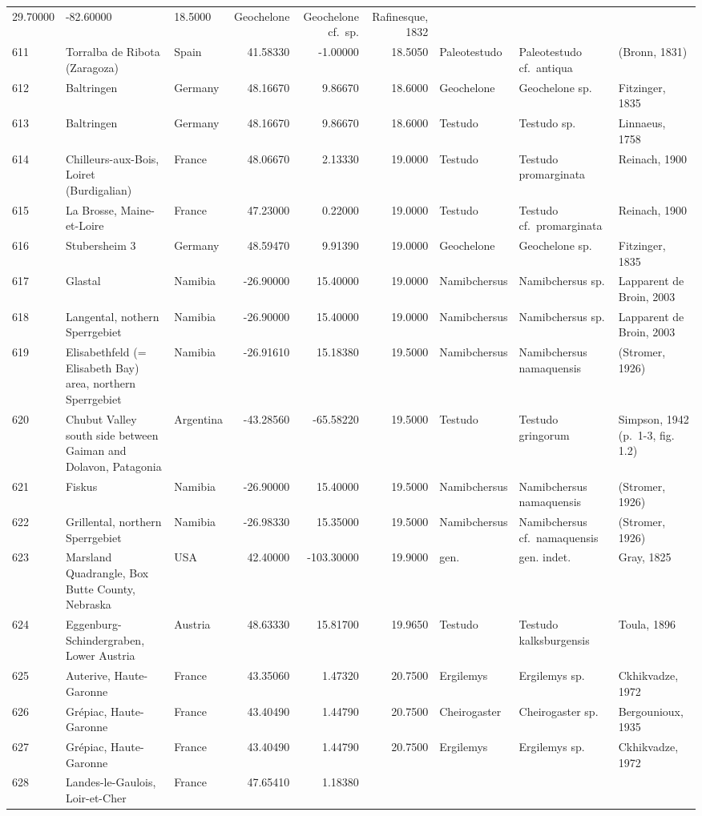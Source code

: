 \begin{landscape}
{\begin{longtable}[]{@{}lllrrrlll@{}}
29.70000 & -82.60000 & 18.5000 & Geochelone & Geochelone cf.~sp. &
Rafinesque, 1832\tabularnewline
611 & Torralba de Ribota (Zaragoza) & Spain & 41.58330 & -1.00000 &
18.5050 & Paleotestudo & Paleotestudo cf.~antiqua & (Bronn,
1831)\tabularnewline
612 & Baltringen & Germany & 48.16670 & 9.86670 & 18.6000 & Geochelone &
Geochelone sp. & Fitzinger, 1835\tabularnewline
613 & Baltringen & Germany & 48.16670 & 9.86670 & 18.6000 & Testudo &
Testudo sp. & Linnaeus, 1758\tabularnewline
614 & Chilleurs-aux-Bois, Loiret (Burdigalian) & France & 48.06670 &
2.13330 & 19.0000 & Testudo & Testudo promarginata & Reinach,
1900\tabularnewline
615 & La Brosse, Maine-et-Loire & France & 47.23000 & 0.22000 & 19.0000
& Testudo & Testudo cf.~promarginata & Reinach, 1900\tabularnewline
616 & Stubersheim 3 & Germany & 48.59470 & 9.91390 & 19.0000 &
Geochelone & Geochelone sp. & Fitzinger, 1835\tabularnewline
617 & Glastal & Namibia & -26.90000 & 15.40000 & 19.0000 & Namibchersus
& Namibchersus sp. & Lapparent de Broin, 2003\tabularnewline
618 & Langental, nothern Sperrgebiet & Namibia & -26.90000 & 15.40000 &
19.0000 & Namibchersus & Namibchersus sp. & Lapparent de Broin,
2003\tabularnewline
619 & Elisabethfeld (= Elisabeth Bay) area, northern Sperrgebiet &
Namibia & -26.91610 & 15.18380 & 19.5000 & Namibchersus & Namibchersus
namaquensis & (Stromer, 1926)\tabularnewline
620 & Chubut Valley south side between Gaiman and Dolavon, Patagonia &
Argentina & -43.28560 & -65.58220 & 19.5000 & Testudo & Testudo
gringorum & Simpson, 1942 (p.~1-3, fig. 1.2)\tabularnewline
621 & Fiskus & Namibia & -26.90000 & 15.40000 & 19.5000 & Namibchersus &
Namibchersus namaquensis & (Stromer, 1926)\tabularnewline
622 & Grillental, northern Sperrgebiet & Namibia & -26.98330 & 15.35000
& 19.5000 & Namibchersus & Namibchersus cf.~namaquensis & (Stromer,
1926)\tabularnewline
623 & Marsland Quadrangle, Box Butte County, Nebraska & USA & 42.40000 &
-103.30000 & 19.9000 & gen. & gen. indet. & Gray, 1825\tabularnewline
624 & Eggenburg-Schindergraben, Lower Austria & Austria & 48.63330 &
15.81700 & 19.9650 & Testudo & Testudo kalksburgensis & Toula,
1896\tabularnewline
625 & Auterive, Haute-Garonne & France & 43.35060 & 1.47320 & 20.7500 &
Ergilemys & Ergilemys sp. & Ckhikvadze, 1972\tabularnewline
626 & Grépiac, Haute-Garonne & France & 43.40490 & 1.44790 & 20.7500 &
Cheirogaster & Cheirogaster sp. & Bergounioux, 1935\tabularnewline
627 & Grépiac, Haute-Garonne & France & 43.40490 & 1.44790 & 20.7500 &
Ergilemys & Ergilemys sp. & Ckhikvadze, 1972\tabularnewline
628 & Landes-le-Gaulois, Loir-et-Cher & France & 47.65410 & 1.18380 &

\end{longtable}}
\end{landscape}
